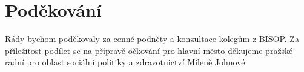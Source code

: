 \section*{Poděkování}

Rády bychom poděkovaly za cenné podněty a konzultace kolegům z BISOP.
Za příležitost podílet se na přípravě očkování pro hlavní město děkujeme pražské radní pro oblast sociální politiky a zdravotnictví Mileně Johnové.
